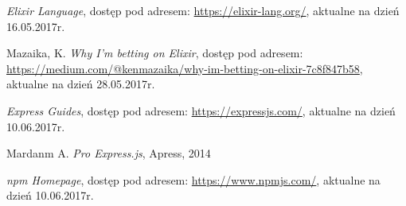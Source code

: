 \documentclass[mgr,oneside]{mgr}
\begin{document}
\begin{thebibliography}{inteligencja}
  \emph{Elixir Language}, dostęp pod adresem: \url{https://elixir-lang.org/}, aktualne na dzień 16.05.2017r.

  Mazaika, K. \emph{Why I'm betting on Elixir}, dostęp pod adresem: \url{https://medium.com/@kenmazaika/why-im-betting-on-elixir-7c8f847b58}, aktualne na dzień 28.05.2017r.

  \emph{Express Guides}, dostęp pod adresem: \url{https://expressjs.com/}, aktualne na dzień 10.06.2017r.

  Mardanm A. \emph{Pro Express.js}, Apress, 2014

  \emph{npm Homepage}, dostęp pod adresem: \url{https://www.npmjs.com/}, aktualne na dzień 10.06.2017r.

\end{thebibliography}
\end{document}
